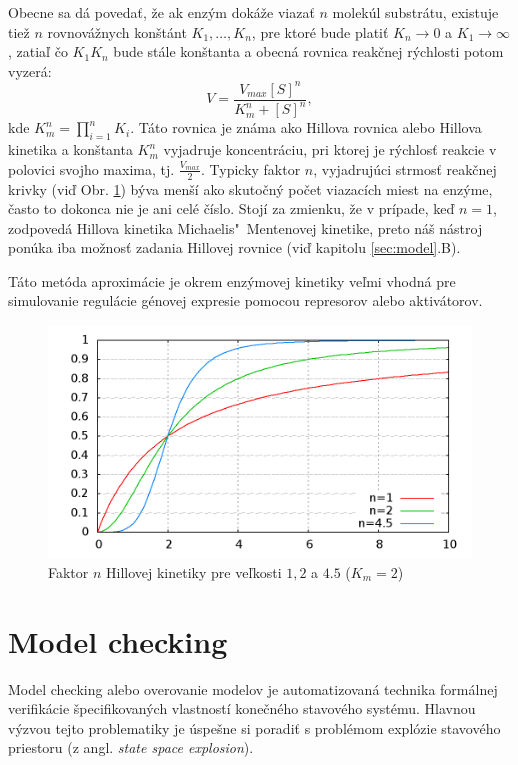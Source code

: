 \documentclass[11pt,final,oneside]{fithesis}
\begin{document}
Obecne sa d\'a poveda\v t, \v ze ak enz\'ym dok\'a\v ze viaza\v t $n$ molek\'ul substr\'atu, existuje tie\v z $n$ rovnov\'a\v znych kon\v st\'ant
$K_1,\dots{},K_n$, pre ktor\'e bude plati\v t $K_n \rightarrow 0$ a $K_1 \rightarrow \infty$, zatia\v l \v co $K_1K_n$ bude st\'ale kon\v stanta a obecn\'a
rovnica reak\v cnej r\'ychlosti potom vyzer\'a:
\begin{equation}
V = \frac{V_{max}[S]^n}{K_m^n + [S]^n},
\end{equation}
kde $K_m^n = \prod_{i=1}^n{K_i}$. T\'ato rovnica je zn\'ama ako Hillova rovnica alebo Hillova kinetika a kon\v stanta $K_m^n$ vyjadruje koncentr\'aciu, 
pri ktorej je r\'ychlos\v t reakcie v polovici svojho maxima, tj. $\frac{V_{max}}{2}$. Typicky faktor $n$, vyjadruj\'uci strmos\v t reak\v cnej krivky 
(vi\v d Obr. \ref{fig:factor})
b\'yva men\v s\'i ako skuto\v cn\'y po\v cet viazac\'ich miest na enz\'yme, \v casto to dokonca nie je ani cel\'e \v c\'islo. Stoj\'i za zmienku, \v ze 
v pr\'ipade, ke\v d $n = 1$, zodpoved\'a Hillova kinetika Michaelis"~Mentenovej kinetike, preto n\'a\v s n\'astroj pon\'uka iba mo\v znos\v t zadania 
Hillovej rovnice (vi\v d kapitolu \ref{sec:model}.B).

T\'ato met\'oda aproxim\'acie je okrem enz\'ymovej kinetiky ve\v lmi vhodn\'a pre simulovanie regul\'acie g\'enovej expresie pomocou represorov alebo 
aktiv\'atorov.
\cite{Keener:1998:MP:Enzymes}
\begin{figure}[h]
	\centering
	\includegraphics[width=1\textwidth]{hill_factor_2.png}
	\caption{Faktor $n$ Hillovej kinetiky pre ve\v lkosti $1, 2$ a $4.5$ ($K_m = 2$)}
	\label{fig:factor}
\end{figure}

\section{Model checking}
\label{sec:modelChecking}
Model checking alebo overovanie modelov je automatizovan\'a technika form\'alnej verifik\'acie \v specifikovan\'ych vlastnost\'i kone\v cn\'eho stavov\'eho 
syst\'e\-mu. Hlavnou v\'yzvou tejto problematiky je \'uspe\v sne si poradi\v t s probl\'emom expl\'ozie stavov\'eho priestoru (z angl. \textit{state space
explosion}).
\end{document}
